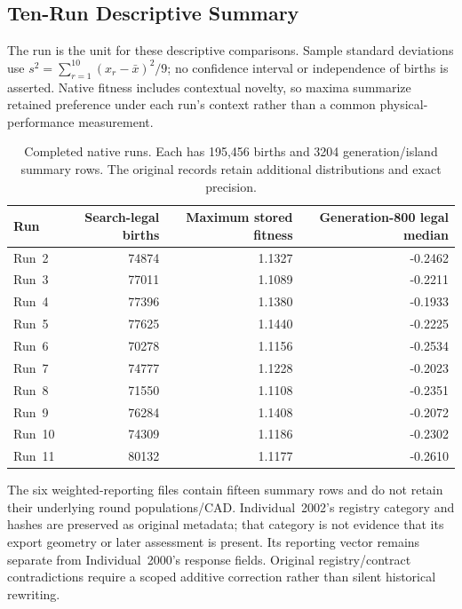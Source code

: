 \subsection{Ten-Run Descriptive Summary}
The run is the unit for these descriptive comparisons. Sample standard deviations use $s^2=\sum_{r=1}^{10}(x_r-\bar x)^2/9$; no confidence interval or independence of births is asserted. Native fitness includes contextual novelty, so maxima summarize retained preference under each run's context rather than a common physical-performance measurement.

\begin{table}[t]
\centering
\caption{Completed native runs. Each has 195,456 births and 3204 generation/island summary rows. The original records retain additional distributions and exact precision.}
\label{tab:cohort3-runs}
\small
\begin{tabular}{@{}lrrr@{}}
\toprule
\textbf{Run} & \textbf{Search-legal births} & \textbf{Maximum stored fitness} & \textbf{Generation-800 legal median} \\
\midrule
Run~2 & 74874 & 1.1327 & -0.2462 \\
Run~3 & 77011 & 1.1089 & -0.2211 \\
Run~4 & 77396 & 1.1380 & -0.1933 \\
Run~5 & 77625 & 1.1440 & -0.2225 \\
Run~6 & 70278 & 1.1156 & -0.2534 \\
Run~7 & 74777 & 1.1228 & -0.2023 \\
Run~8 & 71550 & 1.1108 & -0.2351 \\
Run~9 & 76284 & 1.1408 & -0.2072 \\
Run~10 & 74309 & 1.1186 & -0.2302 \\
Run~11 & 80132 & 1.1177 & -0.2610 \\
\bottomrule
\end{tabular}
\end{table}
The six weighted-reporting files contain fifteen summary rows and do not retain their underlying round populations/CAD. Individual~2002's registry category  and hashes are preserved as original metadata; that category is not evidence that its export geometry or later assessment is present. Its reporting vector remains separate from Individual~2000's response fields. Original registry/contract contradictions require a scoped additive correction rather than silent historical rewriting.
